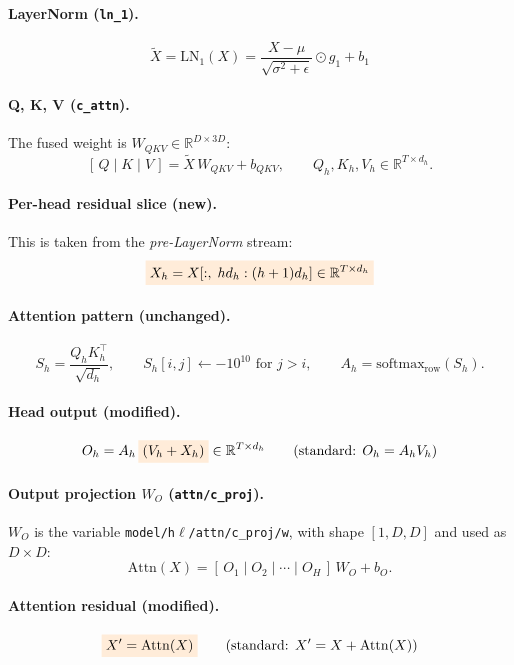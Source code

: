\documentclass[11pt]{article}
\newcommand{\code}[1]{\texttt{#1}}
\newcommand{\chg}[1]{\colorbox{orange!15}{$\displaystyle #1$}}
\begin{document}
\paragraph{LayerNorm (\code{ln\_1}).}
\[
\tilde X = \mathrm{LN}_1(X) = \frac{X-\mu}{\sqrt{\sigma^2+\epsilon}}\odot g_1 + b_1
\]

\paragraph{Q, K, V (\code{c\_attn}).} The fused weight is $W_{QKV}\in\mathbb{R}^{D\times 3D}$:
\[
[\,Q \mid K \mid V\,] = \tilde X\, W_{QKV} + b_{QKV},
\qquad Q_h, K_h, V_h \in \mathbb{R}^{T\times d_h}.
\]

\paragraph{Per-head residual slice (new).} This is taken from the \emph{pre-LayerNorm} stream:
\[
\chg{X_h = X[:,\; h d_h : (h+1) d_h] \in \mathbb{R}^{T\times d_h}}
\]

\paragraph{Attention pattern (unchanged).}
\[
S_h = \frac{Q_h K_h^\top}{\sqrt{d_h}}, \qquad
S_h[i,j] \leftarrow -10^{10} \text{ for } j>i, \qquad
A_h = \mathrm{softmax}_{\text{row}}(S_h).
\]

\paragraph{Head output (modified).}
\[
O_h = A_h\,\chg{(V_h + X_h)} \in \mathbb{R}^{T\times d_h}
\qquad\text{(standard: } O_h = A_h V_h\text{)}
\]

\paragraph{Output projection $W_O$ (\code{attn/c\_proj}).} $W_O$ is the variable
\code{model/h$\ell$/attn/c\_proj/w}, with shape $[1, D, D]$ and used as $D\times D$:
\[
\mathrm{Attn}(X) = [\,O_1 \mid O_2 \mid \cdots \mid O_H\,]\, W_O + b_O .
\]

\paragraph{Attention residual (modified).}
\[
\chg{X' = \mathrm{Attn}(X)}
\qquad\text{(standard: } X' = X + \mathrm{Attn}(X)\text{)}
\]
\end{document}
